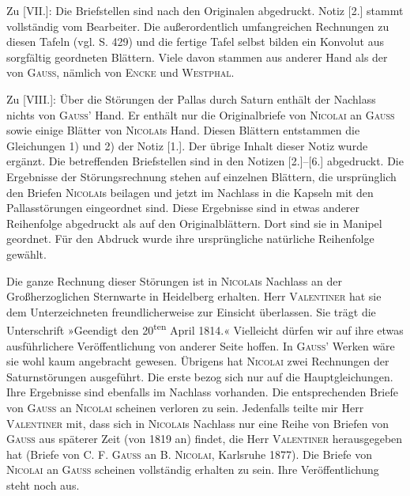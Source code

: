 \clearpage
\begingroup
{}
\renewcommand{\headrulewidth}{0pt}
\par\noindent\hspace*{\parindent}Zu [VII.]: Die Briefstellen sind nach den Originalen abgedruckt.
Notiz [2.] stammt vollständig vom Bearbeiter. Die außerordentlich umfangreichen
Rechnungen zu diesen Tafeln (vgl. S. 429) und die fertige Tafel selbst bilden
ein Konvolut aus sorgfältig geordneten Blättern. Viele davon stammen
aus anderer Hand als der von \textsc{Gauss}, nämlich von \textsc{Encke} und \textsc{Westphal}.

\par\noindent\hspace*{\parindent}Zu [VIII.]: Über die Störungen der Pallas durch Saturn enthält der
Nachlass nichts von \textsc{Gauss}' Hand. Er enthält nur die Originalbriefe von
\textsc{Nicolai} an \textsc{Gauss} sowie einige Blätter von \textsc{Nicolai}s Hand.
Diesen Blättern entstammen die Gleichungen 1) und 2) der Notiz [1.]. Der
übrige Inhalt dieser Notiz wurde ergänzt. Die betreffenden Briefstellen
sind in den Notizen [2.]--[6.] abgedruckt. Die Ergebnisse der Störungsrechnung stehen auf
einzelnen Blättern, die ursprünglich den Briefen \textsc{Nicolai}s beilagen
und jetzt im Nachlass in die Kapseln mit den Pallasstörungen eingeordnet sind.
Diese Ergebnisse sind in etwas anderer Reihenfolge abgedruckt als
auf den Originalblättern. Dort sind sie in Manipel geordnet. Für den
Abdruck wurde ihre ursprüngliche natürliche Reihenfolge gewählt.

\par\noindent\hspace*{\parindent}Die ganze Rechnung dieser Störungen ist in \textsc{Nicolai}s Nachlass
an der Großherzoglichen Sternwarte in Heidelberg erhalten. Herr
\textsc{Valentiner} hat sie dem Unterzeichneten freundlicherweise zur
Einsicht überlassen. Sie trägt die Unterschrift »Geendigt den
20\textsuperscript{ten} April 1814.« Vielleicht dürfen wir auf ihre etwas ausführlichere
Veröffentlichung von anderer Seite hoffen. In \textsc{Gauss}' Werken wäre sie wohl kaum angebracht gewesen.
Übrigens hat \textsc{Nicolai} zwei Rechnungen der
Saturnstörungen ausgeführt. Die erste bezog sich nur auf die Hauptgleichungen.
Ihre Ergebnisse sind ebenfalls im Nachlass vorhanden. Die entsprechenden
Briefe von \textsc{Gauss} an \textsc{Nicolai} scheinen verloren zu sein. Jedenfalls
teilte mir Herr \textsc{Valentiner} mit, dass sich in \textsc{Nicolai}s Nachlass nur
eine Reihe von Briefen von \textsc{Gauss} aus späterer Zeit (von 1819 an) findet,
die Herr \textsc{Valentiner} herausgegeben hat (Briefe von C. F.
\textsc{Gauss} an B. \textsc{Nicolai}, Karlsruhe 1877). Die Briefe von \textsc{Nicolai}
an \textsc{Gauss} scheinen vollständig erhalten zu sein. Ihre Veröffentlichung
steht noch aus.

